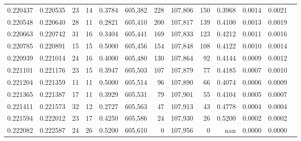 \begin{tabular}{rrrrrrrrrrrrr}
0.220437 & 0.220535 &    23 &  14 &                                     0.3784 & 605,382 &     228 & 107,806 &     150 & 0.3968 & 0.0014 & 0.0021 \\
0.220548 & 0.220640 &    28 &  11 &                                     0.2821 & 605,410 &     200 & 107,817 &     139 & 0.4100 & 0.0013 & 0.0019 \\
0.220663 & 0.220742 &    31 &  16 &                                     0.3404 & 605,441 &     169 & 107,833 &     123 & 0.4212 & 0.0011 & 0.0016 \\
0.220785 & 0.220891 &    15 &  15 &                                     0.5000 & 605,456 &     154 & 107,848 &     108 & 0.4122 & 0.0010 & 0.0014 \\
0.220939 & 0.221014 &    24 &  16 &                                     0.4000 & 605,480 &     130 & 107,864 &      92 & 0.4144 & 0.0009 & 0.0012 \\
0.221101 & 0.221176 &    23 &  15 &                                     0.3947 & 605,503 &     107 & 107,879 &      77 & 0.4185 & 0.0007 & 0.0010 \\
0.221204 & 0.221359 &    11 &  11 &                                     0.5000 & 605,514 &      96 & 107,890 &      66 & 0.4074 & 0.0006 & 0.0009 \\
0.221365 & 0.221387 &    17 &  11 &                                     0.3929 & 605,531 &      79 & 107,901 &      55 & 0.4104 & 0.0005 & 0.0007 \\
0.221411 & 0.221573 &    32 &  12 &                                     0.2727 & 605,563 &      47 & 107,913 &      43 & 0.4778 & 0.0004 & 0.0004 \\
0.221594 & 0.222012 &    23 &  17 &                                     0.4250 & 605,586 &      24 & 107,930 &      26 & 0.5200 & 0.0002 & 0.0002 \\
0.222082 & 0.222587 &    24 &  26 &                                     0.5200 & 605,610 &       0 & 107,956 &       0 &    nan & 0.0000 & 0.0000 \\
\bottomrule
\end{tabular}
